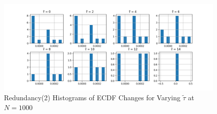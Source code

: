 \begin{figure}
	\centering
	\includegraphics[width=0.8\linewidth]{redtau.png}
	\caption{Redundancy(2) Histograms of ECDF Changes for Varying $\tilde \tau$ at $N=1000$}
	\label{fig:taus}
\end{figure}

